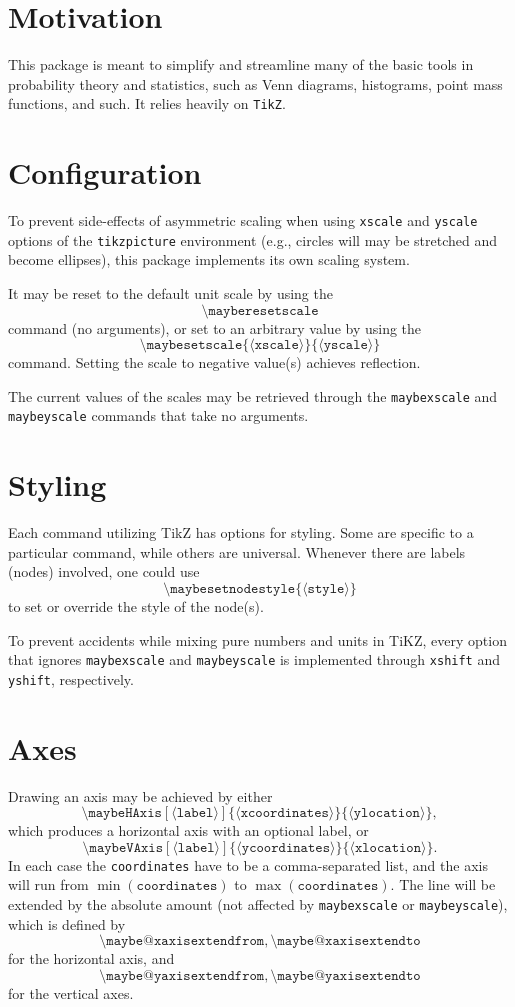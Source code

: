 \documentclass[11pt]{article}
\newcommand{\command}[1]{\text{\textbackslash}\texttt{#1}}
\newcommand{\param}[1]{\{\text{$\langle$}\texttt{#1}\text{$\rangle$}\}}
\newcommand{\optparam}[1]{[\text{$\langle$}\texttt{#1}\text{$\rangle$}]}
\begin{document}
\section{Motivation}
This package is meant to simplify and streamline many of the basic tools in probability theory and statistics, such as Venn diagrams, histograms, point mass functions, and such.
It relies heavily on \texttt{TikZ}.

\section{Configuration}
To prevent side-effects of asymmetric scaling when using \texttt{xscale} and \texttt{yscale} options of the \texttt{tikzpicture} environment (e.g., circles will may be stretched and become ellipses), this package implements its own scaling system.

It may be reset to the default unit scale by using the
\[
    \command{mayberesetscale}
\]
command (no arguments), or set to an arbitrary value by using the
\[
    \command{maybesetscale}\param{xscale}\param{yscale}
\]
command.
Setting the scale to negative value(s) achieves reflection.

The current values of the scales may be retrieved through the \command{maybexscale} and \command{maybeyscale} commands that take no arguments.



\section{Styling}
Each command utilizing TikZ has options for styling.
Some are specific to a particular command, while others are universal.
Whenever there are labels (nodes) involved, one could use
\[
    \command{maybesetnodestyle}\param{style}
\]
to set or override the style of the node(s).


To prevent accidents while mixing pure numbers and units in TiKZ, every option that ignores \command{maybexscale} and \command{maybeyscale} is implemented through \texttt{xshift} and \texttt{yshift}, respectively.


\section{Axes}
Drawing an axis may be achieved by either
\[
    \command{maybeHAxis}\optparam{label}\param{xcoordinates}\param{ylocation},
\]
which produces a horizontal axis with an optional label, or
\[
    \command{maybeVAxis}\optparam{label}\param{ycoordinates}\param{xlocation}.
\]
In each case the \texttt{coordinates} have to be a comma-separated list, and the axis will run from $\min(\texttt{coordinates})$ to $\max(\texttt{coordinates})$.
The line will be extended by the absolute amount (not affected by \command{maybexscale} or \command{maybeyscale}), which is defined by
\[
    \command{maybe$@$xaxisextendfrom}, \command{maybe$@$xaxisextendto}
\]
for the horizontal axis, and
\[
    \command{maybe$@$yaxisextendfrom}, \command{maybe$@$yaxisextendto}
\]
for the vertical axes.
\end{document}
